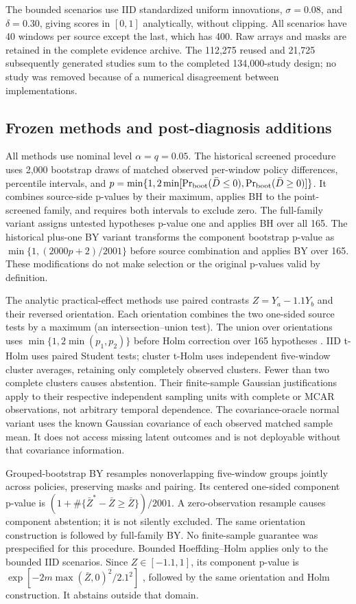 The bounded scenarios use IID standardized uniform innovations,
$\sigma=0.08$, and $\delta=0.30$, giving scores in $[0,1]$ analytically,
without clipping. All scenarios have 40 windows per source except the last,
which has 400. Raw arrays and masks are retained in the complete evidence archive.
The 112,275 reused and 21,725 subsequently generated studies sum to the
completed 134,000-study design; no study was removed because of a numerical
disagreement between implementations.

\subsection{Frozen methods and post-diagnosis additions}
All methods use nominal level $\alpha=q=0.05$.
The historical screened procedure uses 2,000 bootstrap draws of matched
observed per-window policy differences, percentile intervals, and
$p=\min\{1,2\min[\Pr_{\rm boot}(\bar D\leq0),\Pr_{\rm boot}(\bar D\geq0)]\}$.
It combines source-side p-values by their maximum, applies BH to the
point-screened family, and requires both intervals to exclude zero.
The full-family variant assigns untested hypotheses p-value one and applies
BH over all 165. The historical plus-one BY variant transforms the
component bootstrap p-value as $\min\{1,(2000p+2)/2001\}$ before source
combination and applies BY over 165. These modifications do not make
selection or the original p-values valid by definition.

The analytic practical-effect methods use paired contrasts
$Z=Y_a-1.1Y_b$ and their reversed orientation. Each orientation combines the
two one-sided source tests by a maximum (an intersection--union test).
The union over orientations uses $\min\{1,2\min(p_1,p_2)\}$ before Holm
correction over 165 hypotheses \citep{holm1979}.
IID t-Holm uses paired Student tests; cluster t-Holm uses independent
five-window cluster averages, retaining only completely observed clusters.
Fewer than two complete clusters causes abstention. Their finite-sample
Gaussian justifications apply to their respective independent sampling
units with complete or MCAR observations, not arbitrary temporal dependence.
The covariance-oracle normal variant uses the known Gaussian covariance
of each observed matched sample mean. It does not access missing latent
outcomes and is not deployable without that covariance information.

Grouped-bootstrap BY resamples nonoverlapping five-window groups jointly
across policies, preserving masks and pairing. Its centered one-sided
component p-value is
$(1+\#\{\bar Z^*-\bar Z\geq\bar Z\})/2001$.
A zero-observation resample causes component abstention; it is not silently
excluded. The same orientation construction is followed by full-family BY.
No finite-sample guarantee was prespecified for this procedure. Bounded
Hoeffding--Holm applies only to the bounded IID scenarios. Since
$Z\in[-1.1,1]$, its component p-value is
$\exp[-2m\max(\bar Z,0)^2/2.1^2]$ \citep{hoeffding1963}, followed by the same
orientation and Holm construction. It abstains outside that domain.

